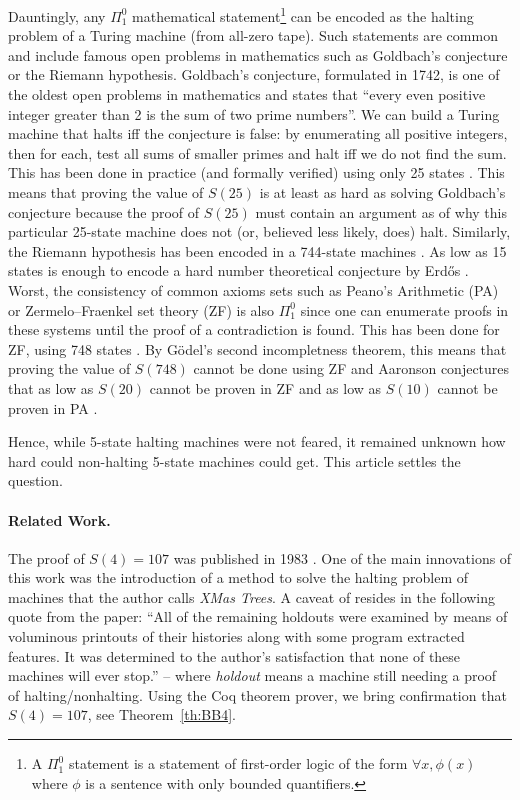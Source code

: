 \documentclass[a4paper,british]{article}
\theoremstyle{definition} %
\numberwithin{equation}{section}
\theoremstyle{definition} %
\newcommand{\BBtheFourth}{107}
\begin{document}
Dauntingly, any $\Pi_1^0$ mathematical statement\footnote{A $\Pi_1^0$ statement is a statement of first-order logic of the form $\forall x, \phi(x)$ where $\phi$ is a sentence with only bounded quantifiers.} can be encoded as the halting problem of a Turing machine (from all-zero tape). Such statements are common and include famous open problems in mathematics such as Goldbach's conjecture or the Riemann hypothesis. Goldbach's conjecture, formulated in 1742, is one of the oldest open problems in mathematics and states that ``every even positive integer greater than 2 is the sum of two prime numbers''. We can build a Turing machine that halts iff the conjecture is false: by enumerating all positive integers, then for each, test all sums of smaller primes and halt iff we do not find the sum. This has been done in practice (and formally verified) using only 25 states \cite{GoldbachTM27, GoldbachTM25}. This means that proving the value of $S(25)$ is at least as hard as solving Goldbach's conjecture because the proof of $S(25)$ must contain an argument as of why this particular 25-state machine does not (or, believed less likely, does) halt. Similarly, the Riemann hypothesis has been encoded in a 744-state machines \cite{RiemannTM,Yedidia2016,BusyBeaverFrontier}. As low as 15 states is enough to encode a hard number theoretical conjecture by Erd\H{o}s \cite{BB15}. Worst, the consistency of common axioms sets such as Peano's Arithmetic (PA) or Zermelo–Fraenkel set theory (ZF) is also $\Pi_1^0$ since one can enumerate proofs in these systems until the proof of a contradiction is found. This has been done for ZF, using 748 states \cite{ZFTM,Yedidia2016,BusyBeaverFrontier,BB748Thesis}. By G\"odel's second incompletness theorem, this means that proving the value of $S(748)$ cannot be done using ZF and Aaronson conjectures that as low as $S(20)$ cannot be proven in ZF and as low as $S(10)$ cannot be proven in PA \cite{BusyBeaverFrontier}.

Hence, while 5-state halting machines were not feared, it remained unknown how hard could non-halting 5-state machines could get. This article settles the question.

\paragraph{Related Work.} The proof of $S(4) = \BBtheFourth$ was published in 1983 \cite{Brady83}. One of the main innovations of this work was the introduction of a method to solve the halting problem of machines that the author calls \textit{XMas Trees}.  A caveat of \cite{Brady83} resides in the following quote from the paper: ``All of the remaining holdouts were examined by means of voluminous printouts of their histories along with some program extracted features. It was determined to the author's satisfaction that none of these machines will ever stop.'' -- where \textit{holdout} means a machine still needing a proof of halting/nonhalting. Using the Coq theorem prover, we bring confirmation that $S(4) = \BBtheFourth$, see Theorem~\ref{th:BB4}.
\end{document}
